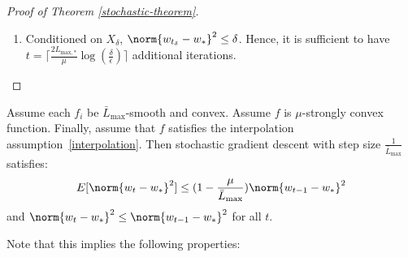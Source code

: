 \documentclass[10pt]{article} %
\begin{document}
\begin{proof}[Proof of Theorem \ref{stochastic-theorem}]
\begin{enumerate}
    \item Conditioned on $X_\delta$, $\norm{w_{t_\delta} - w_{*}}^2 \leq \delta$. Hence, it is sufficient to have $t = \lceil \frac{2L_{\text{max}, *}}{\mu}\log\left(\frac{\delta}{\epsilon}\right) \rceil$ additional iterations.
    \end{enumerate} 
\end{proof}

\iffalse
\begin{lemma}
    \label{lem:SGD}
    Assume each $f_i$ be $\bar{L}_{\text{max}}$-smooth and convex. Assume $f$ is $\mu$-strongly convex function. Finally, assume that $f$ satisfies the interpolation assumption~\eqref{interpolation}. Then stochastic gradient descent with step size $\frac{1}{\bar{L}_{\text{max}}}$ satisfies:
    \begin{align*}
        E[\norm{w_t - w_*}^2] \leq (1 - \frac{\mu}{\bar{L}_{\text{max}}})\norm{w_{t-1} - w_*}^2
    \end{align*}
    and $\norm{w_{t} - w_*}^2 \leq \norm{w_{t-1} - w_*}^2$ for all $t$.
\end{lemma}
Note that this implies the following properties:
\end{document}
